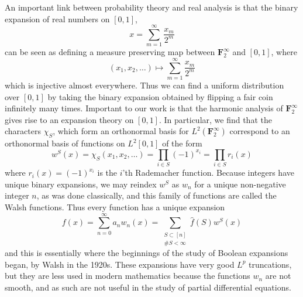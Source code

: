 An important link between probability theory and real analysis is that the binary expansion of real numbers on $[0,1]$,
%
\[ x = \sum_{m = 1}^\infty \frac{x_m}{2^m} \]
%
can be seen as defining a measure preserving map between $\mathbf{F}_2^\infty$ and $[0,1]$, where
%
\[ (x_1, x_2, \dots) \mapsto \sum_{m = 1}^\infty \frac{x_m}{2^m} \]
%
which is injective almost everywhere. Thus we can find a uniform distribution over $[0,1]$ by taking the binary expansion obtained by flipping a fair coin infinitely many times. Important to our work is that the harmonic analysis of $\mathbf{F}_2^\infty$ gives rise to an expansion theory on $[0,1]$. In particular, we find that the characters $\chi_S$, which form an orthonormal basis for $L^2(\mathbf{F}_2^\infty)$ correspond to an orthonormal basis of functions on $L^2[0,1]$ of the form
%
\[ w^S(x) = \chi_S(x_1, x_2, \dots) = \prod_{i \in S} (-1)^{x_i} = \prod_{i \in S} r_i(x) \]
%
where $r_i(x) = (-1)^{x_i}$ is the $i$'th Rademacher function. Because integers have unique binary expansions, we may reindex $w^S$ as $w_n$ for a unique non-negative integer $n$, as was done classically, and this family of functions are called the Walsh functions. Thus every function has a unique expansion
%
\[ f(x) = \sum_{n = 0}^\infty a_n w_n(x) = \sum_{\substack{S \subset [n]\\ \# S < \infty}} \widehat{f}(S) w^S(x) \]
%
and this is essentially where the beginnings of the study of Boolean expansions began, by Walsh in the 1920s. These expansions have very good $L^p$ truncations, but they are less used in modern mathematics because the functions $w_n$ are not smooth, and as such are not useful in the study of partial differential equations.

